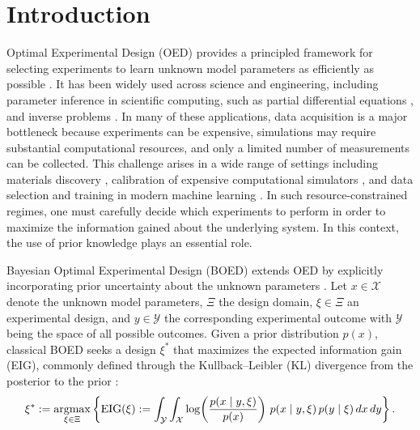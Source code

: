 \documentclass[twoside,11pt]{article}
\newcommand{\argmax}{\mathop{\rm argmax}}
\begin{document}
\section{Introduction}
Optimal Experimental Design (OED) provides a principled framework for selecting experiments to learn unknown model parameters as efficiently as possible \citep{steinberg1984experimental}. It has been widely used across science and engineering, including parameter inference in scientific computing, such as partial differential equations \citep{huan2013simulation,hellmuth2025data}, and inverse problems \citep{haber2008numerical,alexanderian2016fast,ruthotto2018optimal,alexanderian2021optimal,helin2022edge,wu2023fast,liang2024pnod,chang2025provable,chen2026data}. In many of these applications, data acquisition is a major bottleneck because experiments can be expensive, simulations may require substantial computational resources, and only a limited number of measurements can be collected. This challenge arises in a wide range of settings including materials discovery \citep{lookman2019active,chen2021optimal}, calibration of expensive computational simulators \citep{sacks1989design,dunbar2022ensemble,sun2024arma}, and data selection and training in modern machine learning \citep{chen2015selection,yang2016computational,fiez2019sequential,camilleri2021high,wagenmaker2022instance,bhatt2024experimental,huadaptive,zhu2025balancing,gao2026observation}. In such resource-constrained regimes, one must carefully decide which experiments to perform in order to maximize the information gained about the underlying system. In this context, the use of prior knowledge plays an essential role.

Bayesian Optimal Experimental Design (BOED) extends OED by explicitly incorporating prior uncertainty about the unknown parameters \citep{lindley1956measure}. Let $x \in \mathcal{X}$ denote the unknown model parameters, $\Xi$ the design domain, $\xi \in \Xi$ an experimental design, and $y \in \mathcal{Y}$ the corresponding experimental outcome with $\mathcal{Y}$ being the space of all possible outcomes. Given a prior distribution $p(x)$, classical BOED seeks a design $\xi^*$ that maximizes the expected information gain (EIG), commonly defined through the Kullback--Leibler (KL) divergence from the posterior to the prior \citep{shannon1948mathematical}:
\begin{equation*}
\xi^* := \argmax_{\xi \in \Xi}
\left\{
\mathrm{EIG}(\xi)
:=
\int_{\mathcal{Y}} \int_{\mathcal{X}}
\log\!\left(\frac{p(x \mid y,\xi)}{p(x)}\right)
\, p(x \mid y,\xi)\, p(y \mid \xi)\, dx\, dy
\right\}.
\end{equation*}
\end{document}
